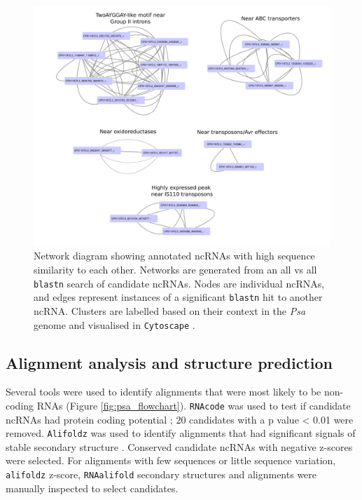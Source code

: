 \begin{figure}[H]
    \includegraphics[scale=0.8]{psa/psa_ncRNA/all_v_all.png}
    \caption[Network diagram showing annotated ncRNAs with high sequence similarity to each other]{Network diagram showing annotated ncRNAs with high sequence similarity to each other. Networks are generated from an all vs all \texttt{blastn} search of candidate ncRNAs. Nodes are individual ncRNAs, and edges represent instances of a significant \texttt{blastn} hit to another ncRNA. Clusters are labelled based on their context in the \textit{Psa} genome and visualised in \texttt{Cytoscape} \citep{Shannon2003-uv}.}
    \label{fig:cytoscape}
\end{figure}

\subsection{Alignment analysis and structure prediction}

Several tools were used to identify alignments that were most likely to be non-coding RNAs (Figure \ref{fig:psa_flowchart}). \texttt{RNAcode} was used to test if candidate ncRNAs had protein coding potential \citep{Washietl2011x}; 20 candidates with a p value < 0.01 were removed. \texttt{Alifoldz} was used to identify alignments that had significant signals of stable secondary structure \citep{Washietl2004-pk}. Conserved candidate ncRNAs with negative z-scores were selected. For alignments with few sequences or little sequence variation, \texttt{alifoldz} z-score, \texttt{RNAalifold} secondary structures and alignments were manually inspected to select candidates.


